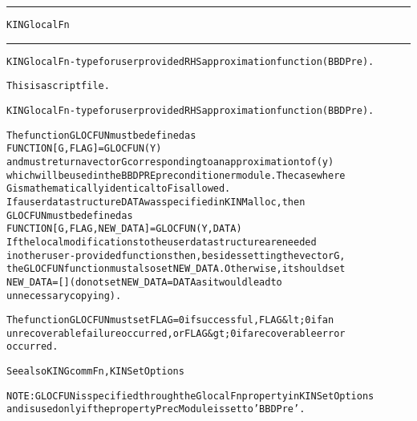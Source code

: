 \begin{samepage}
\hrule
\begin{center}
{\large \verb!KINGlocalFn!}
\label{p:KINGlocalFn}
\end{center}
\hrule\vspace{0.1in}



\begin{alltt}
KINGlocalFn - type for user provided RHS approximation function (BBDPre).
\end{alltt}

\end{samepage}



\begin{samepage}


\begin{alltt}
This is a script file. 
\end{alltt}

\end{samepage}



\begin{alltt}
KINGlocalFn - type for user provided RHS approximation function (BBDPre).

   The function GLOCFUN must be defined as 
        FUNCTION [G, FLAG] = GLOCFUN(Y)
   and must return a vector G corresponding to an approximation to f(y)
   which will be used in the BBDPRE preconditioner module. The case where
   G is mathematically identical to F is allowed.
   If a user data structure DATA was specified in KINMalloc, then
   GLOCFUN must be defined as
        FUNCTION [G, FLAG, NEW_DATA] = GLOCFUN(Y, DATA)
   If the local modifications to the user data structure are needed 
   in other user-provided functions then, besides setting the vector G,
   the GLOCFUN function must also set NEW_DATA. Otherwise, it should set
   NEW_DATA=[] (do not set NEW_DATA = DATA as it would lead to
   unnecessary copying).

   The function GLOCFUN must set FLAG=0 if successful, FLAG&lt;0 if an
   unrecoverable failure occurred, or FLAG&gt;0 if a recoverable error
   occurred.

   See also KINGcommFn, KINSetOptions

   NOTE: GLOCFUN is specified through the GlocalFn property in KINSetOptions
   and is used only if the property PrecModule is set to 'BBDPre'.
\end{alltt}






\vspace{0.1in}